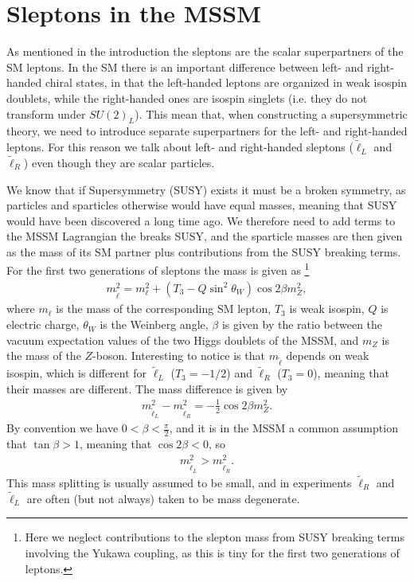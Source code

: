 \documentclass[twocolumn,a4paper,10pt]{article}
\begin{document}
\section{Sleptons in the MSSM}

As mentioned in the introduction the sleptons are the scalar superpartners of the SM leptons. In the 
SM there is an important difference between left- and right-handed chiral states, in that the 
left-handed leptons are organized in weak isospin doublets, while the right-handed ones are 
isospin singlets (i.e. they do not transform under $SU(2)_L$). This mean that, when constructing a 
supersymmetric theory, we need to introduce separate superpartners for the left- and right-handed leptons. 
For this reason we talk about left- and right-handed sleptons ($\tilde{\ell}_L$ and $\tilde{\ell}_R$) 
even though they are scalar particles. 

We know that if Supersymmetry (SUSY) exists it must be a broken symmetry, as particles and sparticles 
otherwise would have equal masses, meaning that SUSY would have been discovered a long time ago.
We therefore need to add terms to the MSSM Lagrangian the breaks SUSY, and the sparticle masses are 
then given as the mass of its SM partner plus contributions from the SUSY breaking terms. For the first 
two generations of sleptons the mass is given as 
\footnote{Here we neglect contributions to the slepton mass from SUSY breaking terms involving 
the Yukawa coupling, as this is tiny for the first two generations of leptons.}
\begin{align*}
m_{\tilde{\ell}}^2 = m_{\ell}^2 + (T_3 - Q\sin^2\theta_W)\cos 2\beta m_Z^2, 
\end{align*}  
where $m_{\ell}$ is the  mass of the corresponding SM lepton, $T_3$ is weak isospin, $Q$ is 
electric charge, $\theta_W$ is the Weinberg angle, $\beta$ is given by the ratio between the 
vacuum expectation values of the two Higgs doublets of the MSSM, and $m_Z$ is the mass of the $Z$-boson.
Interesting to notice is that $m_{\tilde{\ell}}$ depends on weak isospin, which is different for 
$\tilde{\ell}_L$ ($T_3 = -1/2$) and $\tilde{\ell}_R$ ($T_3 = 0$), meaning that their masses are 
different. The mass difference is given by 
\begin{align*}
m_{\tilde{\ell}_L}^2 - m_{\tilde{\ell}_R}^2 = -\frac{1}{2}\cos 2\beta m_Z^2.  
\end{align*}  
By convention we have $0 < \beta < \frac{\pi}{2}$, and it is in the MSSM a 
common assumption that $\tan\beta > 1$, meaning that $\cos 2\beta < 0$, so 
\begin{align*}
m_{\tilde{\ell}_L}^2 > m_{\tilde{\ell}_R}^2. 
\end{align*} 
This mass splitting is usually assumed to be small, and in experiments $\tilde{\ell}_R$ and 
$\tilde{\ell}_L$ are often (but not always) taken to be mass degenerate. 
\end{document}
